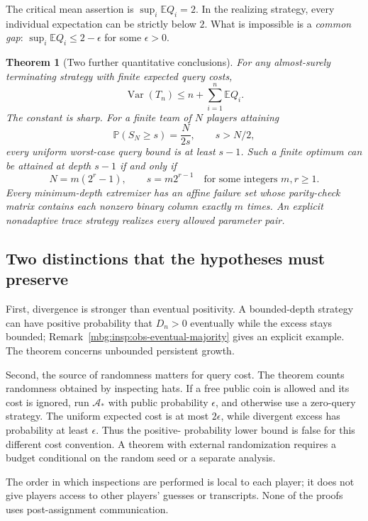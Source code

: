 \documentclass[11pt,letterpaper]{article}
\newtheorem{theorem}{Theorem}[section]
\theoremstyle{definition}
\newcommand{\E}{\mathbb E}
\newcommand{\Prb}{\mathbb P}
\DeclareMathOperator{\Var}{Var}
\begin{document}
The critical mean assertion is
\(\sup_i\E Q_i=2\). In the realizing strategy, every individual
expectation can be strictly below \(2\). What is impossible is a
\emph{common gap}: \(\sup_i\E Q_i\le2-\epsilon\) for some
\(\epsilon>0\).

\begin{theorem}[Two further quantitative conclusions]\label{mbg:insp:thm:main-other}
For any almost-surely terminating strategy with finite expected query
costs,
\[
 \Var(T_n)\le n+\sum_{i=1}^n\E Q_i.
\]
The constant is sharp. For a finite team of \(N\) players attaining
\[
 \Prb(S_N\ge s)=\frac{N}{2s},
 \qquad s>N/2,
\]
every uniform worst-case query bound is at least \(s-1\).
Such a finite optimum can be attained at depth \(s-1\) if and only if
\[
 N=m(2^r-1),\qquad s=m2^{r-1}
 \quad\text{for some integers }m,r\ge1.
\]
Every minimum-depth extremizer has an affine failure set whose
parity-check matrix contains each nonzero binary column exactly \(m\)
times. An explicit nonadaptive trace strategy realizes every allowed
parameter pair.
\end{theorem}

\subsection{Two distinctions that the hypotheses must preserve}

First, divergence is stronger than eventual positivity. A bounded-depth
strategy can have positive probability that \(D_n>0\) eventually while
the excess stays bounded; Remark~\ref{mbg:insp:obs-eventual-majority} gives an
explicit example. The theorem concerns unbounded persistent growth.

Second, the source of randomness matters for query cost. The theorem
counts randomness obtained by inspecting hats. If a free public coin
is allowed and its cost is ignored, run \(\mathcal A_*\) with public
probability \(\epsilon\), and otherwise use a zero-query strategy.
The uniform expected cost is at most \(2\epsilon\), while divergent
excess has probability at least \(\epsilon\). Thus the positive-
probability lower bound is false for this different cost convention.
A theorem with external randomization requires a budget conditional
on the random seed or a separate analysis.

The order in which inspections are performed is local to each player;
it does not give players access to other players' guesses or transcripts.
None of the proofs uses post-assignment communication.
\end{document}
